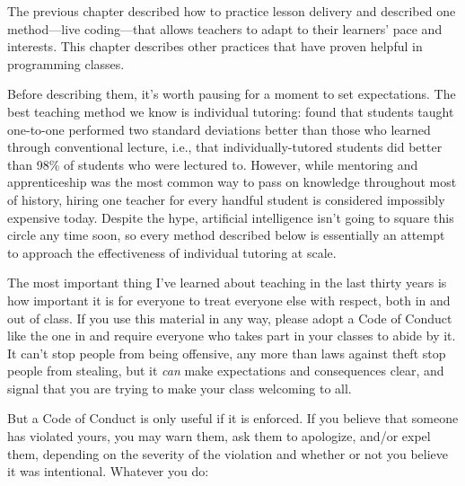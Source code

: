 
The previous chapter described how to practice lesson delivery
and described one method---live coding---that
allows teachers to adapt to their learners' pace and interests.
This chapter describes other practices that have proven helpful in programming classes.

Before describing them,
it's worth pausing for a moment to set expectations.
The best teaching method we know is individual tutoring:
\cite{Bloo1984} found that students taught one-to-one
performed two standard deviations better than those who learned through conventional lecture,
i.e., that individually-tutored students did better than
98\% of students who were lectured to.
However,
while mentoring and apprenticeship was the most common way to pass on knowledge
throughout most of history,
hiring one teacher for every handful student is considered impossibly expensive today.
Despite the hype,
artificial intelligence isn't going to square this circle any time soon,
so every method described below is essentially
an attempt to approach the effectiveness of individual tutoring at scale.


The most important thing I've learned about teaching in the last thirty years is
how important it is for everyone to treat everyone else with respect,
both in and out of class.
If you use this material in any way,
please adopt a Code of Conduct like the one in 
and require everyone who takes part in your classes to abide by it.
It can't stop people from being offensive,
any more than laws against theft stop people from stealing,
but it \emph{can} make expectations and consequences clear,
and signal that you are trying to make your class welcoming to all.

But a Code of Conduct is only useful if it is enforced.
If you believe that someone has violated yours,
you may warn them,
ask them to apologize,
and/or expel them,
depending on the severity of the violation and whether or not you believe it was intentional.
Whatever you do:


